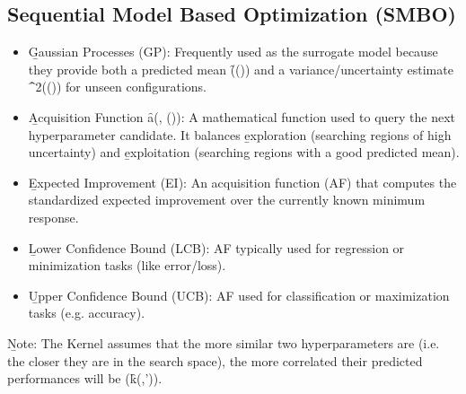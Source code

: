 \subsection{Sequential Model Based Optimization (SMBO)}


\begin{itemize}
\item \b{Gaussian Processes (GP)}: Frequently used as the surrogate model because they provide both a predicted mean \f{\mu(\Psi(\lambda))} and a variance/uncertainty estimate \f{\sigma^2(\Psi(\lambda))} for unseen configurations.
\item \b{Acquisition Function \f{a(\lambda, \Psi(\lambda))}}: A mathematical function used to query the next hyperparameter candidate. It balances \b{exploration} (searching regions of high uncertainty) and \b{exploitation} (searching regions with a good predicted mean).
\item \b{Expected Improvement (EI)}: An acquisition function (AF) that computes the standardized expected improvement over the currently known minimum response.
\item \b{Lower Confidence Bound (LCB)}: AF typically used for regression or minimization tasks (like error/loss).
\item \b{Upper Confidence Bound (UCB)}: AF used for classification or maximization tasks (e.g. accuracy).
\end{itemize}

\vspace{1em}
\b{Note}: The Kernel assumes that the more similar two hyperparameters are (i.e. the closer they are in the search space), the more correlated their predicted performances will be (\f{k(\lambda,\lambda')}).


